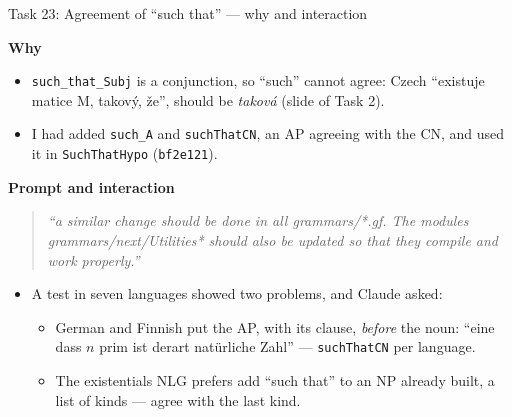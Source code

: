 \documentclass[10pt,aspectratio=169]{beamer}
\newcommand{\bad}[1]{\textcolor{warn}{#1}}
\newcommand{\ok}[1]{\textcolor{good}{#1}}
\newcommand{\commit}[1]{\texttt{\footnotesize #1}}
\newcommand{\prompt}[1]{\begin{quote}\small\itshape ``#1''\end{quote}}
\newcommand{\why}{\par\textcolor{gfblue}{\textbf{Why}}\par}
\newcommand{\how}{\par\textcolor{gfblue}{\textbf{Prompt and interaction}}\par}
\begin{document}
\begin{frame}{Task 23: Agreement of ``such that'' --- why and interaction}
  \why
  \begin{itemize}\small
    \item \texttt{such\_that\_Subj} is a conjunction, so ``such'' cannot agree:
          Czech \bad{``existuje matice M, takový, že''}, should be \emph{taková}
          (slide of Task 2).
    \item I had added \texttt{such\_A} and \texttt{suchThatCN}, an AP agreeing with the
          CN, and used it in \texttt{SuchThatHypo} (\commit{bf2e121}).
  \end{itemize}
  \how
  \prompt{a similar change should be done in all grammars/*.gf. The modules
    grammars/next/Utilities* should also be updated so that they compile and work
    properly.}
  \begin{itemize}\small
    \item A test in seven languages showed two problems, and Claude asked:
      \begin{itemize}\footnotesize
        \item German and Finnish put the AP, with its clause, \emph{before} the noun:
              \bad{``eine dass $n$ prim ist derart natürliche Zahl''} ---
              \ok{\texttt{suchThatCN} per language}.
        \item The existentials NLG prefers add ``such that'' to an NP already built,
              a list of kinds --- \ok{agree with the last kind}.
      \end{itemize}
  \end{itemize}
\end{frame}
\end{document}
